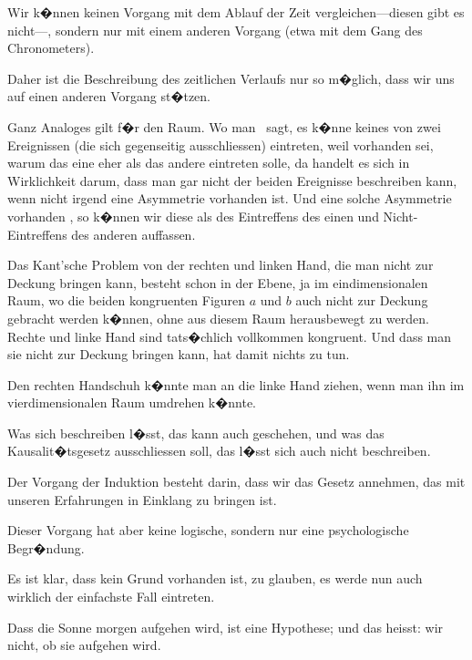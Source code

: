 {Wir k�nnen keinen Vorgang mit dem \glqq{}Ablauf
der Zeit\grqq{} ver\-glei\-chen---diesen gibt es nicht---,
sondern nur mit einem anderen Vorgang (etwa
mit dem Gang des Chronometers).

Daher ist die Beschreibung des zeitlichen
Verlaufs nur so m�glich, dass wir uns auf einen
anderen Vorgang st�tzen.

Ganz Analoges gilt f�r den Raum. Wo man
\zumBeispiel\ sagt, es k�nne keines von zwei Ereignissen
(die sich gegenseitig aus\-schlies\-sen) eintreten, weil
 vorhanden sei, warum das eine
eher als das andere eintreten solle, da handelt es
sich in Wirklichkeit darum, dass man gar nicht
 der beiden Ereignisse beschreiben kann,
wenn nicht irgend eine Asymmetrie vorhanden ist.
Und  eine solche Asymmetrie vorhanden ,
so k�nnen wir diese als  des Eintreffens
des einen und Nicht-Eintreffens des anderen
auffassen.}


{Das Kant'sche Problem von der rechten und
linken Hand, die man nicht zur Deckung bringen
kann, besteht schon in der Ebene, ja im eindimensionalen
Raum, wo die beiden kongruenten
Figuren $a$ und $b$ auch nicht zur Deckung gebracht
werden k�nnen, ohne aus diesem Raum
herausbewegt zu werden. Rechte und linke Hand
sind tats�chlich vollkommen kongruent. Und
dass man sie nicht zur Deckung bringen kann,
hat damit nichts zu tun.


Den rechten Handschuh k�nnte man an die
linke Hand ziehen, wenn man ihn im vierdimensionalen
Raum umdrehen k�nnte.}


{Was sich beschreiben l�sst, das kann auch
geschehen, und was das Kausalit�tsgesetz ausschliessen
soll, das l�sst sich auch nicht beschreiben.}


{Der Vorgang der Induktion besteht darin, dass
wir das  Gesetz annehmen, das mit
unseren Erfahrungen in Einklang zu bringen ist.}


{Dieser Vorgang hat aber keine logische, sondern
nur eine psychologische Begr�ndung.

Es ist klar, dass kein Grund vorhanden ist, zu
glauben, es werde nun auch wirklich der einfachste
Fall eintreten.}


{Dass die Sonne morgen aufgehen wird, ist eine
Hypothese; und das heisst: wir  nicht, ob
sie aufgehen wird.}


